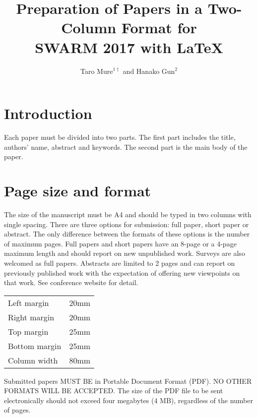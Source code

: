 \documentclass[fleqn,10pt,twocolumn]{SWARM17}
\title{Preparation of Papers in a Two-Column Format for\\
       SWARM 2017 with \LaTeX }
\author{Taro Mure${}^{1\dagger}$ and Hanako Gun${}^{2}$}
\begin{document}
\maketitle


\section{Introduction}

Each paper must be divided into two parts. The first part includes the
title, authors' name, abstract and keywords. The second part is the
main body of the paper.

\section{Page size and format}

The size of the manuscript must be A4 and should be typed in two columns with single spacing.
%
There are three options for submission: full paper, short paper or abstract.
%
The only difference between the formats of these options is the number of maximum pages.
%
Full papers and short papers have an 8-page or a 4-page maximum length and should report on new unpublished work. 
%
Surveys are also welcomed as full papers. 
%
Abstracts are limited to 2 pages and can report on previously published work with the expectation of offering new viewpoints on that work.
%
%
%
See conference website for detail.

\begin{center}
\begin{tabular}{lc}
    Left margin  &  20mm \\
    Right margin &  20mm \\
    Top margin   &  25mm \\
    Bottom margin&  25mm \\
    Column width &  80mm \\
\end{tabular}
\end{center}

Submitted papers MUST BE in Portable Document Format (PDF).  NO OTHER
FORMATS WILL BE ACCEPTED.  The size of the PDF file to be sent
electronically should not exceed four megabytes (4 MB), regardless of
the number of pages.  
\end{document}
